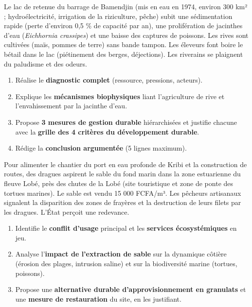 \documentclass[11pt]{article}
\newcounter{popsec}
\newcounter{popsub}
\newcommand{\courssub}[1]{%
  \stepcounter{popsub}%
  \par\vspace{9pt}\noindent{\popxbold\fontsize{11.5}{13}\selectfont\color{popink}{\color{poporange}\thepopsec.\thepopsub}\hspace{6pt}#1}\par\nopagebreak\vspace{4pt}
}
\begin{document}
\courssub{Exercices d'entraînement}

\begin{exercice}
Le lac de retenue du barrage de Bamendjin (mis en eau en 1974, environ 300 km² ; hydroélectricité, irrigation de la riziculture, pêche) subit une sédimentation rapide (perte d'environ 0,5 \% de capacité par an), une prolifération de jacinthes d'eau (\emph{Eichhornia crassipes}) et une baisse des captures de poissons. Les rives sont cultivées (maïs, pommes de terre) sans bande tampon. Les éleveurs font boire le bétail dans le lac (piétinement des berges, déjections). Les riverains se plaignent du paludisme et des odeurs.
\begin{enumerate}
    \item Réalise le \textbf{diagnostic complet} (ressource, pressions, acteurs).
    \item Explique les \textbf{mécanismes biophysiques} liant l'agriculture de rive et l'envahissement par la jacinthe d'eau.
    \item Propose \textbf{3 mesures de gestion durable} hiérarchisées et justifie chacune avec la \textbf{grille des 4 critères du développement durable}.
    \item Rédige la \textbf{conclusion argumentée} (5 lignes maximum).
\end{enumerate}
\end{exercice}

\begin{exercice}
Pour alimenter le chantier du port en eau profonde de Kribi et la construction de routes, des dragues aspirent le sable du fond marin dans la zone estuarienne du fleuve Lobé, près des chutes de la Lobé (site touristique et zone de ponte des tortues marines). Le sable est vendu 15 000 FCFA/m³. Les pêcheurs artisanaux signalent la disparition des zones de frayères et la destruction de leurs filets par les dragues. L'État perçoit une redevance.
\begin{enumerate}
    \item Identifie le \textbf{conflit d'usage} principal et les \textbf{services écosystémiques} en jeu.
    \item Analyse l'\textbf{impact de l'extraction de sable} sur la dynamique côtière (érosion des plages, intrusion saline) et sur la biodiversité marine (tortues, poissons).
    \item Propose une \textbf{alternative durable d'approvisionnement en granulats} et une \textbf{mesure de restauration} du site, en les justifiant.
\end{enumerate}
\end{exercice}
\end{document}
